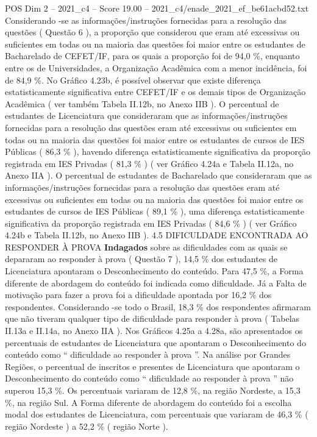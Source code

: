 \begin{textsample}{POS Dim 2 – 2021\_c4 – Score 19.00 – 2021\_c4/enade\_2021\_ef\_be61acbd52.txt}
Considerando -se as informações/instruções fornecidas para a resolução das questões ( Questão 6 ), a proporção que considerou que eram até excessivas ou suficientes em todas ou na maioria das questões foi maior entre os estudantes de Bacharelado de CEFET/IF, para os quais a proporção foi de 94,0 \%, enquanto entre os de Universidades, a Organização Acadêmica com a menor incidência, foi de 84,9 \%.
No Gráfico 4.23b, é possível observar que existe diferença estatisticamente significativa entre CEFET/IF e os demais tipos de Organização Acadêmica ( ver também Tabela II.12b, no Anexo IIB ).
O percentual de estudantes de Licenciatura que consideraram que as informações/instruções fornecidas para a resolução das questões eram até excessivas ou suficientes em todas ou na maioria das questões foi maior entre os estudantes de cursos de IES Públicas ( 86,3 \% ), havendo diferença estatisticamente significativa da proporção registrada em IES Privadas ( 81,3 \% ) ( ver Gráfico 4.24a e Tabela II.12a, no Anexo IIA ).
O percentual de estudantes de Bacharelado que consideraram que as informações/instruções fornecidas para a resolução das questões eram até excessivas ou suficientes em todas ou na maioria das questões foi maior entre os estudantes de cursos de IES Públicas ( 89,1 \% ), uma diferença estatisticamente significativa da proporção registrada em IES Privadas ( 84,6 \% ) ( ver Gráfico 4.24b e Tabela II.12b, no Anexo IIB ). 4.5 DIFICULDADE ENCONTRADA AO RESPONDER À PROVA \textbf{Indagados} sobre as dificuldades com as quais se depararam ao responder à prova ( Questão 7 ), 14,5 \% dos estudantes de Licenciatura apontaram o Desconhecimento do conteúdo.
Para 47,5 \%, a Forma diferente de abordagem do conteúdo foi indicada como dificuldade.
Já a Falta de motivação para fazer a prova foi a dificuldade apontada por 16,2 \% dos respondentes.
Considerando -se todo o Brasil, 18,3 \% dos respondentes afirmaram que não tiveram qualquer tipo de dificuldade para responder à prova ( Tabelas II.13a e II.14a, no Anexo IIA ).
Nos Gráficos 4.25a a 4.28a, são apresentados os percentuais de estudantes de Licenciatura que apontaram o Desconhecimento do conteúdo como “ dificuldade ao responder à prova ”.
Na análise por Grandes Regiões, o percentual de inscritos e presentes de Licenciatura que apontaram o Desconhecimento do conteúdo como “ dificuldade ao responder à prova ” não superou 15,3 \%.
Os percentuais variaram de 12,8 \%, na região Nordeste, a 15,3 \%, na região Sul.
A Forma diferente de abordagem do conteúdo foi a escolha modal dos estudantes de Licenciatura, com percentuais que variaram de 46,3 \% ( região Nordeste ) a 52,2 \% ( região Norte ).

\end{textsample}
